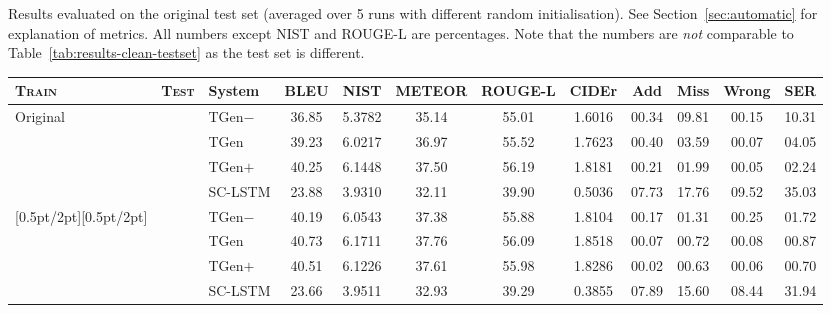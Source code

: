 \documentclass[11pt,a4paper]{article}
\newcommand\Tstrut{\rule{0pt}{2.3ex}}       \newcommand\Bstrut{\rule[-1.5ex]{0pt}{0pt}}
\begin{document}
\begin{table*}[tb]
\caption{Results evaluated on the original test set (averaged over 5 runs with different random initialisation). See Section~\ref{sec:automatic} for explanation of metrics. All numbers except NIST and ROUGE-L are percentages. Note that the numbers are \emph{not} comparable to Table~\ref{tab:results-clean-testset} as the test set is different.}
\label{tab:results}
\end{table*}


\begin{table*}[tb]
\footnotesize\centering
\begin{tabular}{lcl|ccccc|cccc}\hline
\bf \textsc{Train}          & \bf\textsc{Test}              
        & \bf System\hspace{3mm}              & \bf BLEU & \bf NIST & \bf \hspace{-2mm}METEOR\hspace{-2mm} & \bf \hspace{-1mm}ROUGE-L\hspace{-3mm} & \bf CIDEr & \bf Add & \bf Miss & \bf Wrong &\bf SER\Tstrut \\\hline
\multirow{4}{*}{Original} & \parbox[t]{2mm}{}
        & TGen$-$  & 36.85 & 5.3782 & 35.14 & 55.01 & 1.6016 & 00.34 & 09.81 & 00.15 & 10.31\Tstrut  \\ &   & TGen     & 39.23 & 6.0217 & 36.97 & 55.52 & 1.7623 & 00.40 & 03.59 & 00.07 & 04.05  \\ &   & TGen$+$  & 40.25 & 6.1448 & 37.50 & 56.19 & 1.8181 & 00.21 & 01.99 & 00.05 & 02.24  \\ &   & SC-LSTM  & 23.88 & 3.9310 & 32.11 & 39.90 & 0.5036 & 07.73 & 17.76 & 09.52 & 35.03 \\[0.5pt/2pt][0.5pt/2pt]
  & & TGen$-$  & 40.19 & 6.0543 & 37.38 & 55.88 & 1.8104 & 00.17 & 01.31 & 00.25 & 01.72\Tstrut \\ &   & TGen     & 40.73 & 6.1711 & 37.76 & 56.09 & 1.8518 & 00.07 & 00.72 & 00.08 & 00.87  \\ &   & TGen$+$  & 40.51 & 6.1226 & 37.61 & 55.98 & 1.8286 & 00.02 & 00.63 & 00.06 & 00.70  \\ &   & SC-LSTM  & 23.66 & 3.9511 & 32.93 & 39.29 & 0.3855 & 07.89 & 15.60 & 08.44 & 31.94 \\

\end{tabular}
\end{table*}
\end{document}
